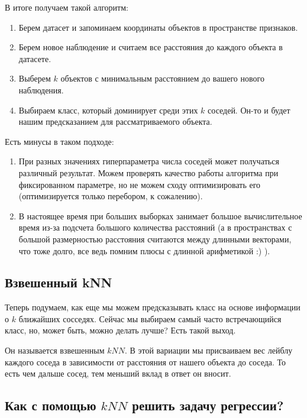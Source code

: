 В итоге получаем такой алгоритм:

\begin{enumerate}
    \item Берем датасет и запоминаем координаты объектов в пространстве признаков.
    \item Берем новое наблюдение и считаем все расстояния до каждого объекта в датасете.
    \item Выберем $k$ объектов с минимальным расстоянием до вашего нового наблюдения.
    \item Выбираем класс, который доминирует среди этих $k$ соседей. Он-то и будет нашим предсказанием для рассматриваемого объекта.
\end{enumerate}

Есть минусы в таком подходе:

\begin{enumerate}
    \item При разных значениях гиперпараметра числа соседей может получаться различный результат. Можем проверять качество работы алгоритма при фиксированном параметре, но не можем сходу оптимизировать его (оптимизируется только перебором, к сожалению).
    \item В настоящее время при больших выборках занимает большое вычислительное время из-за подсчета большого количества расстояний (а в пространствах с большой размерностью расстояния считаются между длинными векторами, что тоже долго, все ведь помним плюсы с длинной арифметикой :) ).
\end{enumerate}


\subsection*{Взвешенный kNN}

Теперь подумаем, как еще мы можем предсказывать класс на основе информации о $k$ ближайших сосседях. Сейчас мы выбираем самый часто встречающийся класс, но, может быть, можно делать лучше? Есть такой выход.

Он называется взвешенным $kNN$. В этой вариации мы  присваиваем вес лейблу каждого соседа в зависимости от расстояния от нашего объекта до соседа. То есть чем дальше сосед, тем меньший вклад в ответ он вносит.

\subsection*{Как с помощью $kNN$ решить задачу регрессии?}

